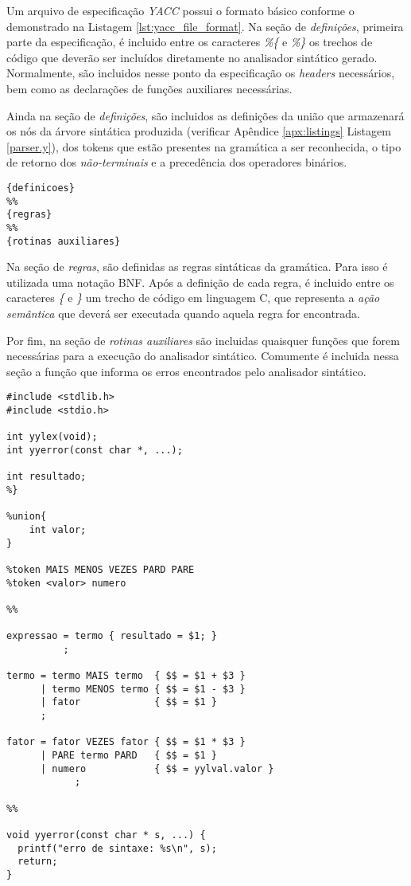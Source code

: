 Um arquivo de especificação \emph{YACC} possui o formato básico conforme
o demonstrado na Listagem \ref{lst:yacc_file_format}. Na seção de
\emph{definições}, primeira parte da especificação, é incluido entre os
caracteres \emph{\%\{} e \emph{\%\}} os trechos de código que deverão ser
incluídos diretamente no analisador sintático gerado. Normalmente, são
incluidos nesse ponto da especificação os \emph{headers} necessários, bem
como as declarações de funções auxiliares necessárias.

Ainda na seção de \emph{definições}, são incluidos as definições da união que
armazenará os nós da árvore sintática produzida (verificar Apêndice
\ref{apx:listings} Listagem \ref{parser.y}), dos tokens que estão presentes na
gramática a ser reconhecida, o tipo de retorno dos \emph{não-terminais} e a
precedência dos operadores binários.

\begin{lstlisting}[label=lst:yacc_file_format, caption=Formato Especificação YACC]
{definicoes}
%%
{regras}
%%
{rotinas auxiliares}
\end{lstlisting}

Na seção de \emph{regras}, são definidas as regras sintáticas da gramática.
Para isso é utilizada uma notação BNF. Após a definição de cada regra, é
incluido entre os caracteres \emph{\{} e \emph{\}} um trecho de código em
linguagem C, que representa a \emph{ação semântica} que deverá ser executada
quando aquela regra for encontrada.

Por fim, na seção de \emph{rotinas auxiliares} são incluidas quaisquer funções
que forem necessárias para a execução do analisador sintático. Comumente é
incluida nessa seção a função que informa os erros encontrados pelo analisador
sintático.

\begin{lstlisting}[label=lst:yacc_example, caption=Exemplo de especificação
YACC]
%{
#include <stdlib.h>
#include <stdio.h>

int yylex(void);
int yyerror(const char *, ...);

int resultado;
%}

%union{
	int valor;
}

%token MAIS MENOS VEZES PARD PARE
%token <valor> numero

%%

expressao = termo { resultado = $1; }
          ;

termo = termo MAIS termo  { $$ = $1 + $3 }
      | termo MENOS termo { $$ = $1 - $3 }
      | fator             { $$ = $1 }
      ;

fator = fator VEZES fator { $$ = $1 * $3 }
      | PARE termo PARD   { $$ = $1 }
      | numero            { $$ = yylval.valor }
			;

%%

void yyerror(const char * s, ...) {
  printf("erro de sintaxe: %s\n", s);
  return;
}
\end{lstlisting}

